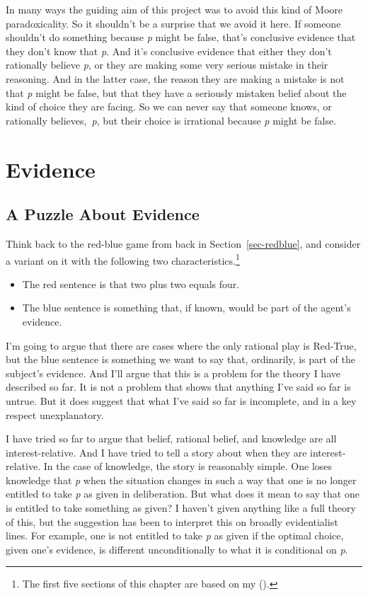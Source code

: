 \documentclass[
  12pt,
  letterpaper,
]{scrbook}
\providecommand{\tightlist}{%
  \setlength{\itemsep}{0pt}\setlength{\parskip}{0pt}}\usepackage{longtable,booktabs,array}
\begin{document}
In many ways the guiding aim of this project was to avoid this kind of
Moore paradoxicality. So it shouldn't be a surprise that we avoid it
here. If someone shouldn't do something because \emph{p} might be false,
that's conclusive evidence that they don't know that \emph{p}. And it's
conclusive evidence that either they don't rationally believe \emph{p},
or they are making some very serious mistake in their reasoning. And in
the latter case, the reason they are making a mistake is not that
\emph{p} might be false, but that they have a seriously mistaken belief
about the kind of choice they are facing. So we can never say that
someone knows, or rationally believes,~\emph{p}, but their choice is
irrational because \emph{p} might be false.


\chapter{Evidence}\label{sec-evidence}

\section{A Puzzle About Evidence}\label{sec-evpuzzle}

Think back to the red-blue game from back in Section~\ref{sec-redblue},
and consider a variant on it with the following two
characteristics.\footnote{The first five sections of this chapter are
  based on my ().}

\begin{itemize}
\tightlist
\item
  The red sentence is that two plus two equals four.
\item
  The blue sentence is something that, if known, would be part of the
  agent's evidence.
\end{itemize}

I'm going to argue that there are cases where the only rational play is
Red-True, but the blue sentence is something we want to say that,
ordinarily, is part of the subject's evidence. And I'll argue that this
is a problem for the theory I have described so far. It is not a problem
that shows that anything I've said so far is untrue. But it does suggest
that what I've said so far is incomplete, and in a key respect
unexplanatory.

I have tried so far to argue that belief, rational belief, and knowledge
are all interest-relative. And I have tried to tell a story about when
they are interest-relative. In the case of knowledge, the story is
reasonably simple. One loses knowledge that \emph{p} when the situation
changes in such a way that one is no longer entitled to take \emph{p} as
given in deliberation. But what does it mean to say that one is entitled
to take something as given? I haven't given anything like a full theory
of this, but the suggestion has been to interpret this on broadly
evidentialist lines. For example, one is not entitled to take \emph{p}
as given if the optimal choice, given one's evidence, is different
unconditionally to what it is conditional on \emph{p}.
\end{document}
